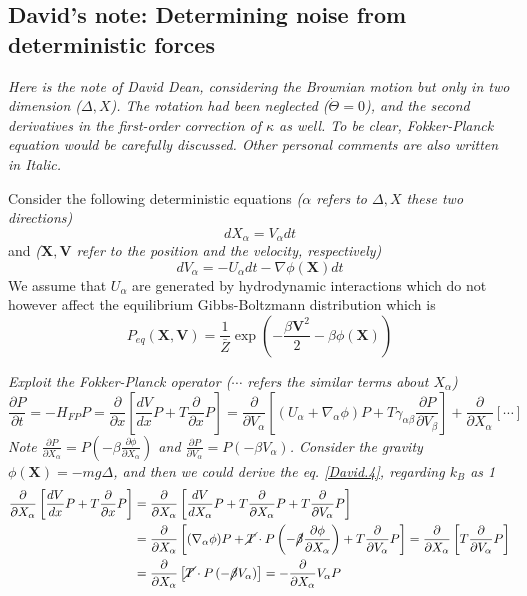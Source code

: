 \documentclass[books,12pt]{elegantpaper}
\newcommand{\ssc}{\subsection}
\newcommand{\pder}[2][]{\frac{\partial#1}{\partial#2}}
\newcommand{\beq}{\begin{equation}}
\newcommand{\eeq}{\end{equation}}
\newcommand{\bgn}{\begin{align}}
\newcommand{\tlag}[1]{\tag{#1} \label{#1}}
\newcommand{\tit}{\textit}
\begin{document}
\ssc{David's note: Determining noise from deterministic forces}
\textit{Here is the note of David Dean, considering the Brownian motion but only in two dimension ($\Delta, X$). The rotation had been neglected ($\dot\Theta=0$), and the second derivatives in the first-order correction of $\kappa$ as well. To be clear, Fokker-Planck equation would be carefully discussed. Other personal comments are also written in Italic.}

Consider the following deterministic equations \tit{($\alpha$ refers to $\Delta, X$ these two directions)}
\beq dX_\alpha = V_\alpha dt \tag{David.1} \label{David.1} \eeq
and \tit{($\mathbf{X},\mathbf{V}$ refer to the position and the velocity, respectively)}
\beq dV_\alpha = -U_\alpha dt - \nabla \phi(\mathbf{X}) dt \tlag{David.2} \eeq 
We assume that $U_\alpha$ are generated by hydrodynamic interactions which do not however affect the equilibrium Gibbs-Boltzmann distribution which is \beq P_{eq} (\mathbf{X},\mathbf{V}) = \frac{1}{\bar{Z}} \exp \left( - \frac{\beta \mathbf{V}^2}{2} - \beta \phi(\mathbf{X}) \right) \tlag{David.3} \eeq

\textit{Exploit the Fokker-Planck operator ($\cdots$ refers the similar terms about $X_\alpha$)}
$$ \pder[P]{t} = - H_{FP} P = \pder{x} \left[ \frac{dV}{dx} P + T \pder{x} P \right] = \pder{V_\alpha} \left[ (U_\alpha + \nabla_\alpha \phi) P + T \gamma_{\alpha\beta} \pder[P]{V_\beta} \right] + \pder{X_\alpha} \left[ \cdots \right] $$
\tit{Note $\pder[P]{X_\alpha} = P \left( -\beta \pder[\phi]{X_\alpha} \right)$ and $\pder[P]{V_\alpha} = P \left( -\beta V_\alpha \right)$. Consider the gravity $\phi(\mathbf{X}) = - mg\Delta$, and then we could derive the eq. \ref{David.4}, regarding $k_B$ as 1}
$$ \bgn
\pder{X_\alpha} \left[ \frac{dV}{dx} P + T \pder{x} P \right] &= \pder{X_\alpha} \left[ \frac{dV}{dX_\alpha} P + T \pder{X_\alpha} P + T \pder{V_\alpha} P \right] \\
&= \pder{X_\alpha} \left[ (\nabla_\alpha\phi)P + \cancel{T} \cdot P \left( -\cancel{\beta} \pder[\phi]{X_\alpha} \right) + T \pder{V_\alpha} P \right] = \pder{X_\alpha} \left[ T \pder{V_\alpha} P \right] \\
&= \pder{X_\alpha} \left[ \cancel{T} \cdot P \left( -\cancel\beta V_\alpha \right) \right] = - \pder{X_\alpha} V_\alpha P
\end{align} $$
\end{document}
